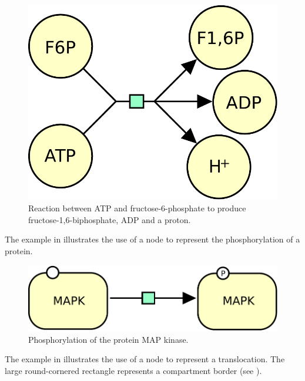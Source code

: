 \begin{figure}[H]
  \centering
  \includegraphics[scale = 0.3]{images/process-reaction}
  \caption{Reaction between ATP and fructose-6-phosphate to produce fructose-1,6-biphosphate, ADP and a proton.}
  \label{fig:trans-react}
\end{figure}

The example in  illustrates the use of a  node to represent the phosphorylation of a protein. 

\begin{figure}[H]
  \centering
  \includegraphics[scale = 0.3]{images/process-phosphorylation}
  \caption{Phosphorylation of the protein MAP kinase.}
  \label{fig:trans-phos}
\end{figure}


The example in  illustrates the use of a  node to represent a translocation. The large round-cornered rectangle represents a compartment border (see ).

